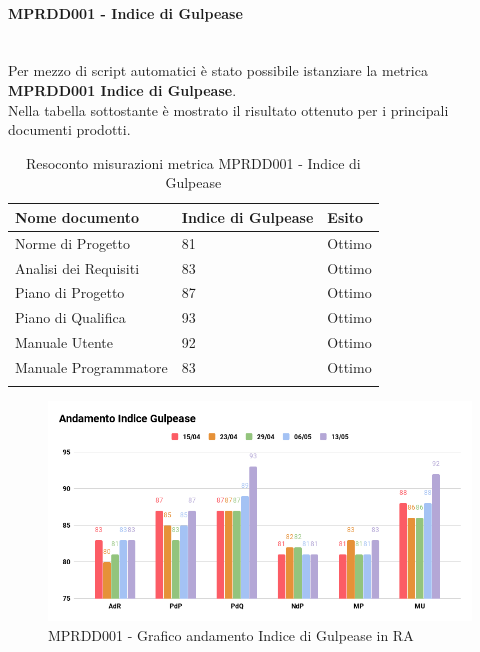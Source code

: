 \paragraph{MPRDD001 - Indice di Gulpease}\mbox{}\\[0.4cm]
Per mezzo di script automatici è stato possibile istanziare la metrica  \textbf{MPRDD001 Indice di Gulpease}.\\
Nella tabella sottostante è mostrato il risultato ottenuto per i principali documenti prodotti.
\begin{center}%
	\centering
	\renewcommand{\arraystretch}{1.5}
	\begin{longtable}{  p{5cm}  p{5cm} p{3cm}  }
		\rowcolor{tableHeadYellow}
		\textbf{Nome documento}   & \textbf{Indice di \mbox{Gulpease}} & \textbf{Esito} \\ 
		\endhead
		Norme di Progetto         & 81                                 & Ottimo \\
		Analisi dei Requisiti     & 83                                 & Ottimo \\
		Piano di Progetto         & 87                                & Ottimo \\
		Piano di Qualifica        & 93                                 & Ottimo \\
		Manuale Utente  	& 92 & Ottimo \\
		Manuale Programmatore & 83 & Ottimo \\
		\rowcolor{white}
		\caption{Resoconto misurazioni metrica MPRDD001 - Indice di Gulpease}
	\end{longtable}
	\begin{figure}[H]
		\centering
		\includegraphics[width=13cm,keepaspectratio]{../includes/pics/Indice_GulpeaseRA.png}
		\caption{\label{fig:mission}MPRDD001 - Grafico andamento Indice di Gulpease in RA}
	\end{figure}
\end{center}
